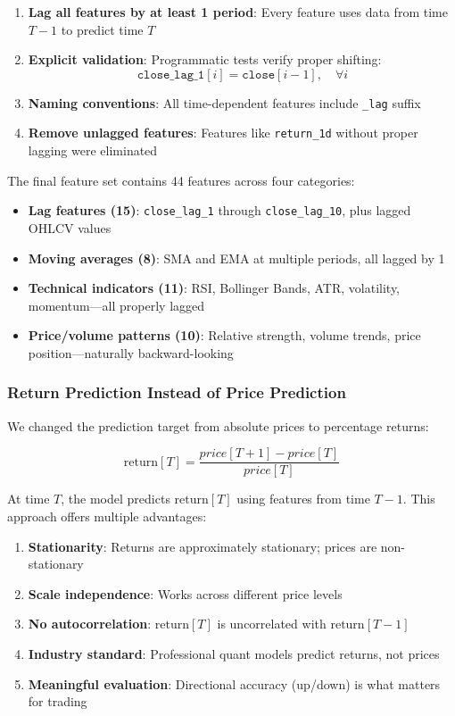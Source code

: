 \documentclass[conference]{IEEEtran}
\begin{document}
\begin{enumerate}
    \item \textbf{Lag all features by at least 1 period}: Every feature uses data from time $T-1$ to predict time $T$
    \item \textbf{Explicit validation}: Programmatic tests verify proper shifting:
    \begin{equation}
    \texttt{close\_lag\_1}[i] = \texttt{close}[i-1], \quad \forall i
    \end{equation}
    \item \textbf{Naming conventions}: All time-dependent features include \texttt{\_lag} suffix
    \item \textbf{Remove unlagged features}: Features like \texttt{return\_1d} without proper lagging were eliminated
\end{enumerate}

The final feature set contains 44 features across four categories:

\begin{itemize}
    \item \textbf{Lag features (15)}: \texttt{close\_lag\_1} through \texttt{close\_lag\_10}, plus lagged OHLCV values
    \item \textbf{Moving averages (8)}: SMA and EMA at multiple periods, all lagged by 1
    \item \textbf{Technical indicators (11)}: RSI, Bollinger Bands, ATR, volatility, momentum—all properly lagged
    \item \textbf{Price/volume patterns (10)}: Relative strength, volume trends, price position—naturally backward-looking
\end{itemize}

\subsubsection{Return Prediction Instead of Price Prediction}

We changed the prediction target from absolute prices to percentage returns:

\begin{equation}
\text{return}[T] = \frac{price[T+1] - price[T]}{price[T]}
\end{equation}

At time $T$, the model predicts $\text{return}[T]$ using features from time $T-1$. This approach offers multiple advantages:

\begin{enumerate}
    \item \textbf{Stationarity}: Returns are approximately stationary; prices are non-stationary
    \item \textbf{Scale independence}: Works across different price levels
    \item \textbf{No autocorrelation}: $\text{return}[T]$ is uncorrelated with $\text{return}[T-1]$
    \item \textbf{Industry standard}: Professional quant models predict returns, not prices
    \item \textbf{Meaningful evaluation}: Directional accuracy (up/down) is what matters for trading
\end{enumerate}
\end{document}
